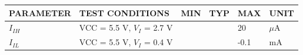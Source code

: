 {\setlength{\tabcolsep}{7pt}\begin{tabular}{llllll}\toprule
PARAMETER & TEST CONDITIONS & MIN & TYP & MAX & UNIT\\\midrule
$I_{IH}$ & VCC = 5.5 V, $V_I$ = 2.7 V & & & 20 & $\mu$A\\
$I_{IL}$ & VCC = 5.5 V, $V_I$ = 0.4 V & & & -0.1 & mA\\\bottomrule
\end{tabular}}
